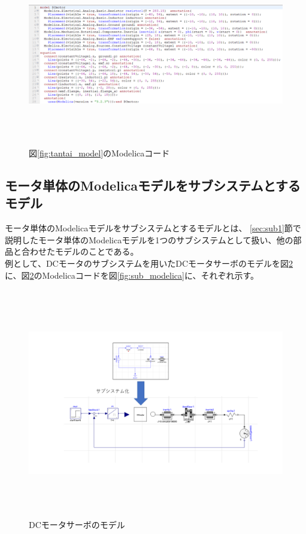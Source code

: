 \begin{figure}[t]
	\centering
	\includegraphics[width=16.5cm,height=8cm]{./Image/tantai_modelica.png}
	\caption{図\ref{fig:tantai_model}のModelicaコード}
	\label{fig:tantai_modelica}
  \end{figure}

  \vspace{-1zh}

\subsection{モータ単体のModelicaモデルをサブシステムとするモデル} %
モータ単体のModelicaモデルをサブシステム\cite{modelicaシステム本}とするモデルとは、
\ref{sec:sub1}節で説明したモータ単体のModelicaモデルを1つのサブシステムとして扱い、他の部品と合わせたモデルのことである。\\
例として、DCモータのサブシステムを用いたDCモータサーボのモデルを図\ref{fig:submodel}に、図\ref{fig:submodel}のModelicaコードを図\ref{fig:sub_modelica}に、それぞれ示す。

\begin{figure}[t]
	\centering
	\includegraphics[width=16.5cm,height=10cm]{./Image/submodel_pack.png}
	\caption{DCモータサーボのモデル}
	\label{fig:submodel}
  \end{figure}

